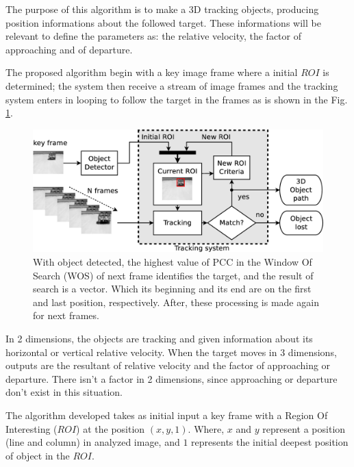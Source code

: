 The purpose of this algorithm is to make a 3D tracking objects, producing position informations 
about the followed target.
These informations will be relevant to define the parameters 
as: the relative velocity, the factor of approaching and of departure.

The proposed algorithm begin with a key image frame where a initial $ROI$ is determined; 
the system then receive a stream of image frames and the tracking system 
enters in looping to follow the target in the frames as is shown in the Fig. \ref{fig:system}.


\begin{figure}[bhp]
\includegraphics[width=\columnwidth]{images/figure1-diagram1.eps}
\caption{With object detected, the highest value of PCC in the Window Of Search 
(WOS) of next frame identifies the target, 
and the result of search is a vector. 
Which its beginning and its end are on the first and last position, respectively. 
After, these processing is made again for 
next frames.}
\label{fig:system}
\end{figure}

In 2 dimensions, the objects are tracking and given information about its horizontal 
or vertical relative velocity.
When the target moves in 3 dimensions, outputs are the resultant of relative 
velocity and the factor of approaching or departure. 
There isn't a factor in 2 dimensions, since approaching or departure don't exist 
in this situation.

The algorithm developed takes as initial input a key frame with a Region Of 
Interesting ($ROI$) at the position $(x,y,1)$.
Where, $x$ and $y$ represent a position (line and column) in analyzed image,
and $1$ represents the initial deepest position of object in the $ROI$.


